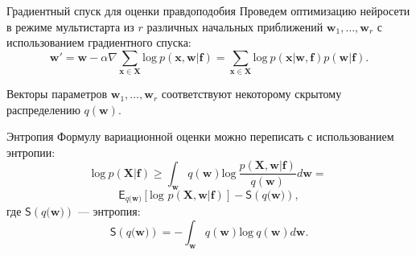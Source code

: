 \documentclass[10pt,pdf,utf8,russian,aspectratio=169]{beamer}
\begin{document}
\begin{frame}{Градиентный спуск для оценки правдоподобия}
Проведем оптимизацию нейросети в режиме мультистарта из $r$ различных начальных приближений $\mathbf{w}_1, \dots, \mathbf{w}_r$ с использованием градиентного спуска:
\[
\mathbf{w}' = \mathbf{w} - \alpha  \nabla \sum_{\mathbf{x} \in \mathbf{X}} \text{log}~p(\mathbf{x},\mathbf{w}|\mathbf{f}) = \sum_{\mathbf{x} \in \mathbf{X}} \text{log}~p(\mathbf{x}|\mathbf{w}, \mathbf{f}) p(\mathbf{w}|\mathbf{f}).
\]

Векторы параметров $\mathbf{w}_1,\dots,\mathbf{w}_r$ соответствуют некоторому скрытому распределению $q(\mathbf{w})$.

\end{frame}

\begin{frame}{Энтропия}
Формулу вариационной оценки можно переписать с использованием энтропии:
$$\text{log}~p(\mathbf{X}|\mathbf{f}) \geq 
\int_{\mathbf{w}} q(\mathbf{w})\text{log}~\frac{p(\mathbf{X},\mathbf{w}|\mathbf{f})}{q(\mathbf{w})}d\mathbf{w} = 
$$
$$
\mathsf{E}_{q(\mathbf{w)}}[\text{log~}p (\mathbf{X}, \mathbf{w}| \mathbf{f})] - \mathsf{S}({q(\mathbf{w)}}),
$$
где $\mathsf{S}({q(\mathbf{w)}})$ --- энтропия:
$$
\mathsf{S}({q(\mathbf{w)}}) = - \int_{\mathbf{w}} q(\mathbf{w})\text{log}~q(\mathbf{w})d\mathbf{w}.  	
$$
\end{frame}
\end{document}
